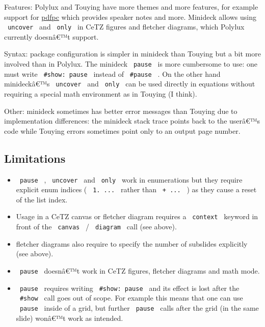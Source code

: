 Features: Polylux and Touying have more themes and more features, for
example support for \href{https://pdfpc.github.io/}{pdfpc} which
provides speaker notes and more. Minideck allows using
\texttt{\ uncover\ } and \texttt{\ only\ } in CeTZ figures and fletcher
diagrams, which Polylux currently doesnâ€™t support.

Syntax: package configuration is simpler in minideck than Touying but a
bit more involved than in Polylux. The minideck \texttt{\ pause\ } is
more cumbersome to use: one must write \texttt{\ \#show:\ pause\ }
instead of \texttt{\ \#pause\ } . On the other hand minideckâ€™s
\texttt{\ uncover\ } and \texttt{\ only\ } can be used directly in
equations without requiring a special math environment as in Touying (I
think).

Other: minideck sometimes has better error messages than Touying due to
implementation differences: the minideck stack trace points back to the
userâ€™s code while Touying errors sometimes point only to an output
page number.

\subsection{Limitations}\label{limitations}

\begin{itemize}
\tightlist
\item
  \texttt{\ pause\ } , \texttt{\ uncover\ } and \texttt{\ only\ } work
  in enumerations but they require explicit enum indices (
  \texttt{\ 1.\ ...\ } rather than \texttt{\ +\ ...\ } ) as they cause a
  reset of the list index.
\item
  Usage in a CeTZ canvas or fletcher diagram requires a
  \texttt{\ context\ } keyword in front of the \texttt{\ canvas\ } /
  \texttt{\ diagram\ } call (see above).
\item
  fletcher diagrams also require to specify the number of subslides
  explicitly (see above).
\item
  \texttt{\ pause\ } doesnâ€™t work in CeTZ figures, fletcher diagrams
  and math mode.
\item
  \texttt{\ pause\ } requires writing \texttt{\ \#show:\ pause\ } and
  its effect is lost after the \texttt{\ \#show\ } call goes out of
  scope. For example this means that one can use \texttt{\ pause\ }
  inside of a grid, but further \texttt{\ pause\ } calls after the grid
  (in the same slide) wonâ€™t work as intended.
\end{itemize}

